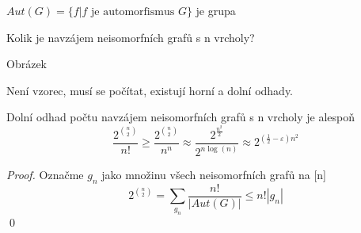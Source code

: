 \documentclass[../main.tex]{subfiles}
\begin{document}
\begin{remark}
    $Aut(G) = \{f | f\text{ je automorfismus }G\}$ je grupa
\end{remark}


\begin{example}
    Kolik je navzájem neisomorfních grafů s n vrcholy?

    Obrázek 

    Není vzorec, musí se počítat, existují horní a dolní odhady.
\end{example}

\begin{claim}
Dolní odhad počtu navzájem neisomorfních grafů s n vrcholy je alespoň
\begin{equation}
    \frac{2^{\binom{n}{2}}}{n!} \geq \frac{2^{\binom{n}{2}}}{n^n} \approx \frac{2^{\frac{n^2}{2}}}{2^{n \log(n)}} \approx 2^{(\frac{1}{2} - \varepsilon)n^2} 
\end{equation}
\end{claim}

\begin{proof}
    Označme $g_n$ jako množinu všech neisomorfních grafů na [n]
    \begin{equation*}
        2^{\binom{n}{2}} = \sum_{g_n} \frac{n!}{|Aut(G)|} \leq n! |g_n|
    \end{equation*}
    \qed
\end{proof}
\end{document}
